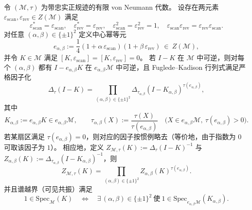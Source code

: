 \begin{theorem}\label{thm:op-algebra-fkdet-chi-sector-factorization}
令 \((\mathcal M,\tau)\) 为带忠实正规迹的有限 von Neumann 代数。
设存在两元素 \(\varepsilon_{\mathrm{scan}},\varepsilon_{\mathrm{rev}}\in Z(\mathcal M)\) 满足
\[
\varepsilon_{\mathrm{scan}}^\ast=\varepsilon_{\mathrm{scan}},\quad
\varepsilon_{\mathrm{rev}}^\ast=\varepsilon_{\mathrm{rev}},\quad
\varepsilon_{\mathrm{scan}}^2=\varepsilon_{\mathrm{rev}}^2=1,\quad
\varepsilon_{\mathrm{scan}}\varepsilon_{\mathrm{rev}}=\varepsilon_{\mathrm{rev}}\varepsilon_{\mathrm{scan}}.
\]
对任意 \((\alpha,\beta)\in\{\pm1\}^2\) 定义中心幂等元
\[
e_{\alpha,\beta}:=\frac14(1+\alpha\,\varepsilon_{\mathrm{scan}})(1+\beta\,\varepsilon_{\mathrm{rev}})\ \in\ Z(\mathcal M),
\]
并令 \(K\in\mathcal M\) 满足 \([K,\varepsilon_{\mathrm{scan}}]=[K,\varepsilon_{\mathrm{rev}}]=0\)。
若 \(I-K\) 在 \(\mathcal M\) 中可逆，则对每个 \((\alpha,\beta)\) 都有 \(I-e_{\alpha,\beta}K\) 在 \(e_{\alpha,\beta}\mathcal M\) 中可逆，且 Fuglede--Kadison 行列式满足严格因子化
\[
\Delta_\tau(I-K)
=
\prod_{(\alpha,\beta)\in\{\pm1\}^2}
\Delta_{\tau_{\alpha,\beta}}\!\left(I-K_{\alpha,\beta}\right)^{\tau(e_{\alpha,\beta})},
\]
其中
\[
K_{\alpha,\beta}:=e_{\alpha,\beta}K\in e_{\alpha,\beta}\mathcal M,
\qquad
\tau_{\alpha,\beta}(X):=\frac{\tau(X)}{\tau(e_{\alpha,\beta})}\quad\bigl(X\in e_{\alpha,\beta}\mathcal M,\ \tau(e_{\alpha,\beta})>0\bigr).
\]
若某扇区满足 \(\tau(e_{\alpha,\beta})=0\)，则对应的因子按惯例略去（等价地，由于指数为 \(0\) 可取该因子为 \(1\)）。
相应地，定义 \(Z_{\mathcal M,\tau}(K):=\Delta_\tau(I-K)^{-1}\) 与
\(
Z_{\alpha,\beta}(K):=\Delta_{\tau_{\alpha,\beta}}(I-K_{\alpha,\beta})^{-1}
\)，则
\[
Z_{\mathcal M,\tau}(K)
=
\prod_{(\alpha,\beta)\in\{\pm1\}^2}Z_{\alpha,\beta}(K)^{\tau(e_{\alpha,\beta})}.
\]
并且谱越界（可见共振）满足
\[
1\in\mathrm{Spec}_{\mathcal M}(K)\quad\Longleftrightarrow\quad
\exists\,(\alpha,\beta)\in\{\pm1\}^2\ \text{使}\ 1\in\mathrm{Spec}_{e_{\alpha,\beta}\mathcal M}(K_{\alpha,\beta}).
\]
\end{theorem}

